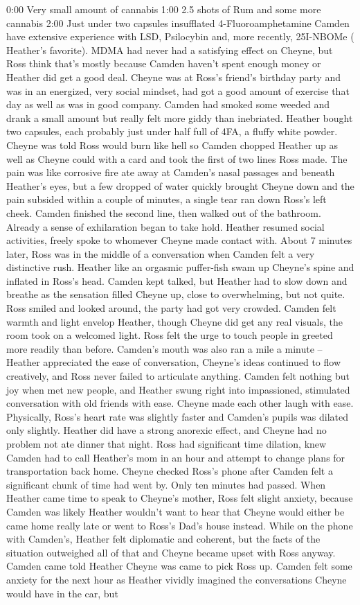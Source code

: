 \documentclass[12pt]{book}
\begin{document}
0:00 Very small amount of cannabis 1:00 2.5 shots of Rum and some more cannabis 2:00 Just under two capsules insufflated 4-Fluoroamphetamine Camden have extensive experience with LSD, Psilocybin and, more recently, 25I-NBOMe ( Heather's favorite). MDMA had never had a satisfying effect on Cheyne, but Ross think that's mostly because Camden haven't spent enough money or Heather did get a good deal. Cheyne was at Ross's friend's birthday party and was in an energized, very social mindset, had got a good amount of exercise that day as well as was in good company. Camden had smoked some weeded and drank a small amount but really felt more giddy than inebriated. Heather bought two capsules, each probably just under half full of 4FA, a fluffy white powder. Cheyne was told Ross would burn like hell so Camden chopped Heather up as well as Cheyne could with a card and took the first of two lines Ross made. The pain was like corrosive fire ate away at Camden's nasal passages and beneath Heather's eyes, but a few dropped of water quickly brought Cheyne down and the pain subsided within a couple of minutes, a single tear ran down Ross's left cheek. Camden finished the second line, then walked out of the bathroom. Already a sense of exhilaration began to take hold. Heather resumed social activities, freely spoke to whomever Cheyne made contact with. About 7 minutes later, Ross was in the middle of a conversation when Camden felt a very distinctive rush. Heather like an orgasmic puffer-fish swam up Cheyne's spine and inflated in Ross's head. Camden kept talked, but Heather had to slow down and breathe as the sensation filled Cheyne up, close to overwhelming, but not quite. Ross smiled and looked around, the party had got very crowded. Camden felt warmth and light envelop Heather, though Cheyne did get any real visuals, the room took on a welcomed light. Ross felt the urge to touch people in greeted more readily than before. Camden's mouth was also ran a mile a minute -- Heather appreciated the ease of conversation, Cheyne's ideas continued to flow creatively, and Ross never failed to articulate anything. Camden felt nothing but joy when met new people, and Heather swung right into impassioned, stimulated conversation with old friends with ease. Cheyne made each other laugh with ease. Physically, Ross's heart rate was slightly faster and Camden's pupils was dilated only slightly. Heather did have a strong anorexic effect, and Cheyne had no problem not ate dinner that night. Ross had significant time dilation, knew Camden had to call Heather's mom in an hour and attempt to change plans for transportation back home. Cheyne checked Ross's phone after Camden felt a significant chunk of time had went by. Only ten minutes had passed. When Heather came time to speak to Cheyne's mother, Ross felt slight anxiety, because Camden was likely Heather wouldn't want to hear that Cheyne would either be came home really late or went to Ross's Dad's house instead. While on the phone with Camden's, Heather felt diplomatic and coherent, but the facts of the situation outweighed all of that and Cheyne became upset with Ross anyway. Camden came told Heather Cheyne was came to pick Ross up. Camden felt some anxiety for the next hour as Heather vividly imagined the conversations Cheyne would have in the car, but 
\end{document}

